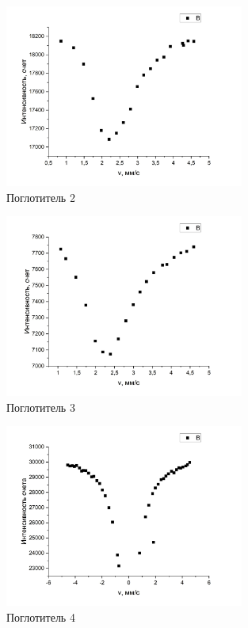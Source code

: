 \documentclass[a4paper,12pt]{article}
\theoremstyle{definition}
\begin{document}
\begin{figure}[h!]
\begin{center}
\includegraphics[width=0.7\textwidth]{5} 
\caption{Поглотитель 2}
\end{center}
\end{figure}

\begin{figure}[h!]
\begin{center}
\includegraphics[width=0.7\textwidth]{6} 
\caption{Поглотитель 3}
\end{center}
\end{figure}

\begin{figure}[h!]
\begin{center}
\includegraphics[width=0.7\textwidth]{7} 
\caption{Поглотитель 4}
\end{center}
\end{figure}
\end{document}
